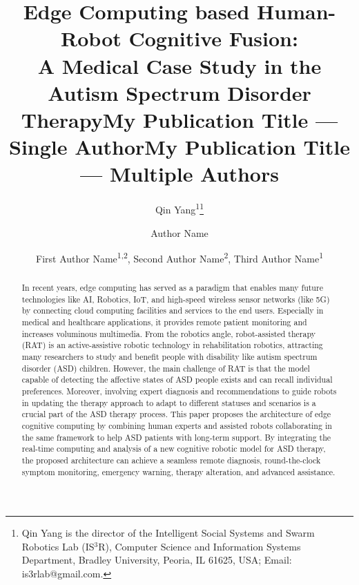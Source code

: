 \documentclass[letterpaper]{article} %
\title{Edge Computing based Human-Robot Cognitive Fusion: \\ A Medical Case Study in the Autism Spectrum Disorder Therapy}
\author{
    Qin Yang\textsuperscript{\rm 1}\thanks{Qin Yang is the director of the Intelligent Social Systems and Swarm Robotics Lab (IS$^3$R), Computer Science and Information Systems Department, Bradley University, Peoria, IL 61625, USA; Email: is3rlab@gmail.com.}
}
\title{My Publication Title --- Single Author}
\author {
    Author Name
}
\title{My Publication Title --- Multiple Authors}
\author {
    First Author Name\textsuperscript{\rm 1,\rm 2},
    Second Author Name\textsuperscript{\rm 2},
    Third Author Name\textsuperscript{\rm 1}
}
\begin{document}
\maketitle

\begin{abstract}

In recent years, edge computing has served as a paradigm that enables many future technologies like AI, Robotics, IoT, and high-speed wireless sensor networks (like 5G) by connecting cloud computing facilities and services to the end users. Especially in medical and healthcare applications, it provides remote patient monitoring and increases voluminous multimedia.
From the robotics angle, robot-assisted therapy (RAT) is an active-assistive robotic technology in rehabilitation robotics, attracting many researchers to study and benefit people with disability like autism spectrum disorder (ASD) children.
However, the main challenge of RAT is that the model capable of detecting the affective states of ASD people exists and can recall individual preferences. Moreover, involving expert diagnosis and recommendations to guide robots in updating the therapy approach to adapt to different statuses and scenarios is a crucial part of the ASD therapy process. This paper proposes the architecture of edge cognitive computing by combining human experts and assisted robots collaborating in the same framework to help ASD patients with long-term support. By integrating the real-time computing and analysis of a new cognitive robotic model for ASD therapy, the proposed architecture can achieve a seamless remote diagnosis, round-the-clock symptom monitoring, emergency warning, therapy alteration, and advanced assistance.



\end{abstract}
\end{document}
